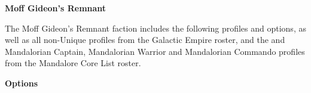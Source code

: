 \documentclass{article}
\begin{document}
\vspace{0.6cm}

{\Large \textbf{Moff Gideon's Remnant}}
\vspace{0.3cm}

\begin{minipage}{19cm}
    The Moff Gideon's Remnant faction includes the following profiles and options,
    as well as all non-Unique profiles from the Galactic Empire roster,
    and the and Mandalorian Captain, Mandalorian Warrior and Mandalorian Commando
    profiles from the Mandalore Core List roster.
\end{minipage}

\vspace{0.3cm}
{\scriptsize
\setlength\extrarowheight{1.5pt}

}
\vspace{0.6cm}

{\large \textbf{Options}}
\vspace{0.3cm}
\begin{multicols}{2}
    {\scriptsize

    \setlength\extrarowheight{1.5pt}
    

    \vspace{0.6cm}

    \setlength\extrarowheight{1.5pt}
    

    \vspace{0.6cm}

    \setlength\extrarowheight{1.5pt}
    

    \vspace{0.6cm}

    \setlength\extrarowheight{1.5pt}
    

    \vspace{0.6cm}

    \setlength\extrarowheight{1.5pt}
    

    \vspace{0.6cm}

    \setlength\extrarowheight{1.5pt}
    
    }
\end{multicols}
\end{document}
